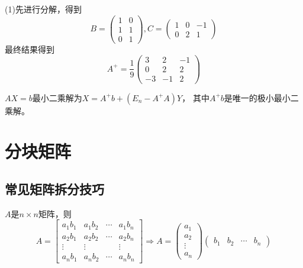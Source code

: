 \begin{solution}
  (1)先进行分解，得到
  \begin{equation*}
    B = \left(
      \begin{array}{cc}
        1&0\\
        1&1\\
        0&1
      \end{array}
    \right), C = \left(
      \begin{array}{ccc}
        1&0&-1 \\
         0&2&1
      \end{array}
    \right)
  \end{equation*}
  最终结果得到
  \begin{equation*}
    A^+ = \frac{1}{9} \left(
      \begin{array}{ccc}
        3&2&-1 \\
         0&2&2 \\
         -3&-1&2
      \end{array}
    \right)
  \end{equation*}
\end{solution}

\begin{theorem}[最小二乘解的表达式]
  $AX = b$最小二乘解为$X = A^+b + (E_n - A^+A)Y$，
  其中$A^+b$是唯一的极小最小二乘解。
\end{theorem}

\section{分块矩阵}

\subsection{常见矩阵拆分技巧}

\begin{theorem}[点态分解]
  $A$是$n \times n$矩阵，则
  \begin{equation*}
    A = \left[
      \begin{array}{cccc}
        a_1b_1&a_1b_2&\cdots&a_1b_n \\
              a_2b_1&a_2b_2&\cdots&a_2b_n \\
              \vdots&\vdots&&\vdots \\
              a_nb_1&a_nb_2&\cdots&a_nb_n
      \end{array}
    \right] \Rightarrow A = \left(
      \begin{array}{c}
        a_1\\
        a_2\\
        \vdots \\
        a_n
      \end{array}
    \right) \left(
      \begin{array}{cccc}
        b_1&b_2&\cdots&b_n
      \end{array}
    \right)
  \end{equation*}
\end{theorem}



